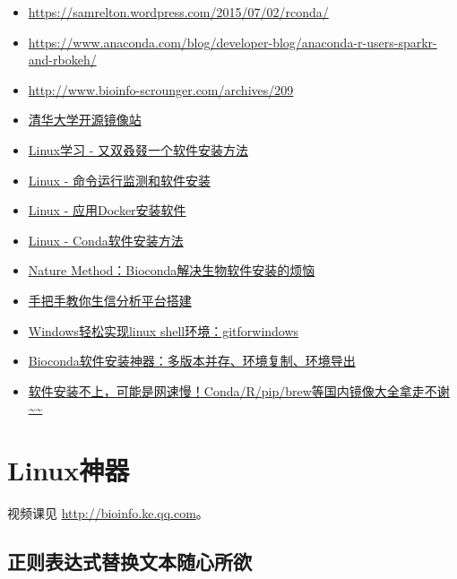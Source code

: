 \documentclass[]{article}
\providecommand{\tightlist}{%
  \setlength{\itemsep}{0pt}\setlength{\parskip}{0pt}}
\numberwithin{figure}{section}
\numberwithin{table}{section}
\begin{document}
\begin{itemize}
\tightlist
\item
  \url{https://samrelton.wordpress.com/2015/07/02/rconda/}
\item
  \url{https://www.anaconda.com/blog/developer-blog/anaconda-r-users-sparkr-and-rbokeh/}
\item
  \url{http://www.bioinfo-scrounger.com/archives/209}
\item
  \href{https://mirror.tuna.tsinghua.edu.cn/help/anaconda/}{清华大学开源镜像站}
\item
  \href{http://mp.weixin.qq.com/s/A4_j8ZbyprMr1TT_wgisQQ}{Linux学习 - 又双叒叕一个软件安装方法}
\item
  \href{http://mp.weixin.qq.com/s/TNU7X2mhfVVffaJ7NRBuNA}{Linux - 命令运行监测和软件安装}
\item
  \href{http://mp.weixin.qq.com/s/HLHiWMLaWtB7SOJe_jP3mA}{Linux - 应用Docker安装软件}
\item
  \href{http://mp.weixin.qq.com/s/A4_j8ZbyprMr1TT_wgisQQ}{Linux - Conda软件安装方法}
\item
  \href{https://mp.weixin.qq.com/s/VeexRyguwozqrMaOeeMF7Q}{Nature Method：Bioconda解决生物软件安装的烦恼}
\item
  \href{https://mp.weixin.qq.com/s/6BPvNOw854pkdJCklelGWQ}{手把手教你生信分析平台搭建}
\item
  \href{https://mp.weixin.qq.com/s/KtM4c4o4iLfD4ZkEnMi1pg}{Windows轻松实现linux shell环境：gitforwindows}
\item
  \href{https://mp.weixin.qq.com/s?__biz=MzI5MTcwNjA4NQ==\&mid=2247489108\&idx=1\&sn=0d0ec3dc931271a509fed07cb0efcfd7\&scene=21\#wechat_redirect}{Bioconda软件安装神器：多版本并存、环境复制、环境导出}
\item
  \href{https://mp.weixin.qq.com/s/eIw-k6RcR5KQFbrNmBsWBw}{软件安装不上，可能是网速慢！Conda/R/pip/brew等国内镜像大全拿走不谢\textasciitilde\textasciitilde{}}
\end{itemize}

\hypertarget{LinuxGreatTools}{%
\section{Linux神器}\label{LinuxGreatTools}}

视频课见 \url{http://bioinfo.ke.qq.com}。

\hypertarget{regularExpr}{%
\subsection{正则表达式替换文本随心所欲}\label{regularExpr}}
\end{document}
